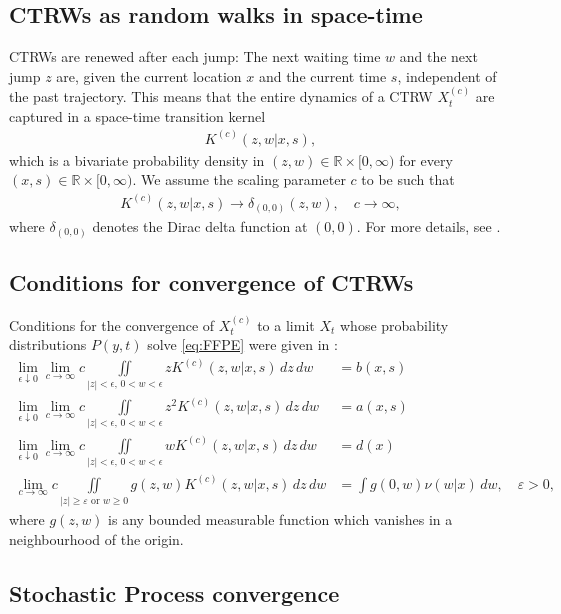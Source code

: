 \documentclass[a4paper,12pt]{elsarticle}
\numberwithin{equation}{section}
\theoremstyle{plain}
\theoremstyle{definition}
\theoremstyle{remark}
\numberwithin{equation}{section}
\newcommand{\spc}{\mathbb R}
\newcommand{\spctim}{\spc \times [0,\infty)}
\newcommand{\1}{\mathbf 1}
\begin{document}
\subsection{CTRWs as random walks in space-time}

CTRWs are renewed after each jump: The next waiting time $w$ and the next jump $z$ are, given the current location $x$ and the current time $s$, independent of the past trajectory.  This means that the entire dynamics of a CTRW $X^{(c)}_t$ are captured in a space-time transition kernel
\begin{align} \label{eq:STJK}
K^{(c)}(z,w | x,s),
\end{align}
which is a bivariate probability density in $(z,w) \in \spctim$ for every $(x,s) \in \spctim$.  We assume the scaling parameter $c$ to be such that
\begin{align}
K^{(c)}(z,w | x,s) \to \delta_{(0,0)}(z,w), \quad c \to \infty,
\end{align}
where $\delta_{(0,0)}$ denotes the Dirac delta function at $(0,0)$. For more details, see \cite{Straka17}.


\subsection{Conditions for convergence of CTRWs}

Conditions for the convergence of $X^{(c)}_t$ to a limit $X_t$ whose probability distributions $P(y,t)$ solve \eqref{eq:FFPE} were given in \cite{Straka17}:
\begin{align} \label{eq:cond1}
\lim_{\epsilon \downarrow 0} \lim_{c \to \infty}
c \iint\limits_{|z|< \epsilon,\,0<  w < \epsilon} z K^{(c)}(z,w | x,s)\,dz\,dw &= b(x,s)
\\ \label{eq:cond2}
\lim_{\epsilon \downarrow 0} \lim_{c \to \infty}
c \iint\limits_{|z|< \epsilon, \,0<w < \epsilon} z^2 K^{(c)}(z,w | x,s)\,dz\,dw &= a(x,s)
\\ \label{eq:cond3}
\lim_{\epsilon \downarrow 0} \lim_{c \to \infty}
c \iint\limits_{|z|< \epsilon, \,0<w < \epsilon} w K^{(c)}(z,w | x,s)\,dz\,dw &= d(x)
\\
\label{eq:cond4}
\lim_{c \to \infty}
c \iint\limits_{|z| \ge \varepsilon \text{ or } w \ge 0} g(z,w) K^{(c)} (z,w | x,s)\,dz\,dw &= \int g(0,w) \nu(w|x)\,dw, \quad \varepsilon > 0,
\end{align}
where $g(z,w)$ is any bounded measurable function which vanishes in a neighbourhood of the origin.


\subsection{Stochastic Process convergence}
\end{document}

